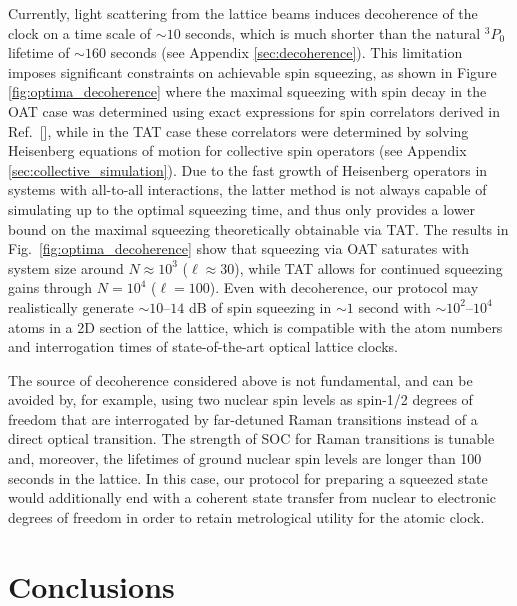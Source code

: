 \documentclass[aps,prx,superscriptaddress,twocolumn]{revtex4-2}
\begin{document}
Currently, light scattering from the lattice beams induces decoherence of the clock on a time scale of $\sim10$ seconds\cite{goban2018emergence, hutson2019engineering}, which is much shorter than the natural $^3P_0$ lifetime of $\sim160$ seconds (see Appendix \ref{sec:decoherence}).
This limitation imposes significant constraints on achievable spin squeezing, as shown in Figure \ref{fig:optima_decoherence} where the maximal squeezing with spin decay in the OAT case was determined using exact expressions for spin correlators derived in Ref.~[], while in the TAT case these correlators were determined by solving Heisenberg equations of motion for collective spin operators (see Appendix \ref{sec:collective_simulation}).
Due to the fast growth of Heisenberg operators in systems with all-to-all interactions, the latter method is not always capable of simulating up to the optimal squeezing time, and thus only provides a lower bound on the maximal squeezing theoretically obtainable via TAT.
The results in Fig.~\ref{fig:optima_decoherence} show that squeezing via OAT saturates with system size around $N\approx10^3$ ($\ell\approx30$), while TAT allows for continued squeezing gains through $N=10^4$ ($\ell=100$).
Even with decoherence, our protocol may realistically generate $\sim10$--$14$ dB of spin squeezing in $\sim1$ second with $\sim10^2$--$10^4$ atoms in a 2D section of the lattice, which is compatible with the atom numbers and interrogation times of state-of-the-art optical lattice clocks\cite{campbell2017fermidegenerate, marti2018imaging}.

The source of decoherence considered above is not fundamental, and can be avoided by, for example, using two nuclear spin levels as spin-1/2 degrees of freedom that are interrogated by far-detuned Raman transitions instead of a direct optical transition\cite{mancini2015observation}.
The strength of SOC for Raman transitions is tunable and, moreover, the lifetimes of ground nuclear spin levels are longer than 100 seconds in the lattice\cite{goban2018emergence}.
In this case, our protocol for preparing a squeezed state would additionally end with a coherent state transfer from nuclear to electronic degrees of freedom in order to retain metrological utility for the atomic clock.


\section{Conclusions}
\end{document}

